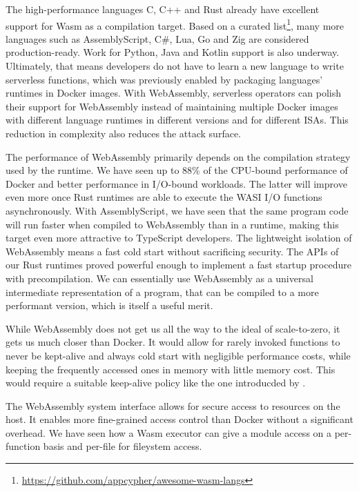 \begin{description}[style=multiline, leftmargin=2.5cm, font=\bfseries]

    \item[Language Support] The high-performance languages C, C++ and Rust already have excellent support for Wasm as a compilation target. Based on a curated list\footnote{\url{https://github.com/appcypher/awesome-wasm-langs}}, many more languages such as AssemblyScript, C\#, Lua, Go and Zig are considered production-ready. Work for Python, Java and Kotlin support is also underway.
    Ultimately, that means developers do not have to learn a new language to write serverless functions, which was previously enabled by packaging languages' runtimes in Docker images. With WebAssembly, serverless operators can polish their support for WebAssembly instead of maintaining multiple Docker images with different language runtimes in different versions and for different ISAs. This reduction in complexity also reduces the attack surface.

    \item[Performance \& Cold Start] The performance of WebAssembly primarily depends on the compilation strategy used by the runtime. We have seen up to 88\% of the CPU-bound performance of Docker and better performance in I/O-bound workloads. The latter will improve even more once Rust runtimes are able to execute the WASI I/O functions asynchronously. With AssemblyScript, we have seen that the same program code will run faster when compiled to WebAssembly than in a  runtime, making this target even more attractive to TypeScript developers. The lightweight isolation of WebAssembly means a fast cold start without sacrificing security. The APIs of our Rust runtimes proved powerful enough to implement a fast startup procedure with precompilation. We can essentially use WebAssembly as a universal intermediate representation of a program, that can be compiled to a more performant version, which is itself a useful merit.
    
    \item[Scale-to-zero] While WebAssembly does not get us all the way to the ideal of scale-to-zero, it gets us much closer than Docker. It would allow for rarely invoked functions to never be kept-alive and always cold start with negligible performance costs, while keeping the frequently accessed ones in memory with little memory cost. This would require a suitable keep-alive policy like the one introducded by \citeauthor{Shahrad2020}.

    \item[System Access] The WebAssembly system interface allows for secure access to resources on the host. It enables more fine-grained access control than Docker without a significant overhead. We have seen how a Wasm executor can give a module access on a per-function basis and per-file for fileystem access.

\end{description}

